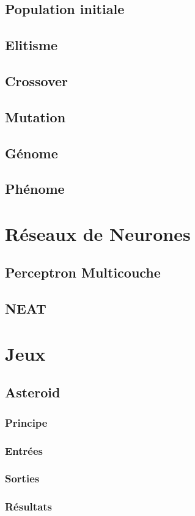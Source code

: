 \documentclass{article}
\begin{document}
\subsection{Population initiale}
\subsection{Elitisme}
\subsection{Crossover}
\subsection{Mutation}
\subsection{Génome}
\subsection{Phénome}

\section{Réseaux de Neurones}
\subsection{Perceptron Multicouche}
\subsection{NEAT}

\section{Jeux}
\subsection{Asteroid}
\subsubsection{Principe}
\subsubsection{Entrées}
\subsubsection{Sorties}
\subsubsection{Résultats}
\end{document}
